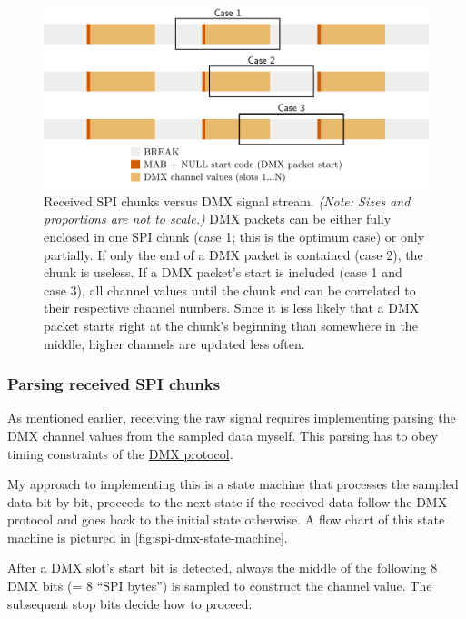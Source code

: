 \begin{figure}
\centering
\includegraphics[width=1.00000\textwidth]{Bilder/spi-dmx-chunks.pdf}
\caption[Received SPI chunks versus DMX signal stream]{Received SPI chunks versus DMX signal stream. \emph{(Note:
Sizes and proportions are not to scale.)} DMX packets can be either
fully enclosed in one SPI chunk (case 1; this is the optimum case) or
only partially. If only the end of a DMX packet is contained (case 2),
the chunk is useless. If a DMX packet's start is included (case 1 and
case 3), all channel values until the chunk end can be correlated to
their respective channel numbers. Since it is less likely that a DMX
packet starts right at the chunk's beginning than somewhere in the
middle, higher channels are updated less
often.}\label{fig:spi-dmx-chunks}
\end{figure}

\subsubsection{Parsing received SPI
chunks}\label{parsing-received-spi-chunks}

As mentioned earlier, receiving the raw signal requires implementing
parsing the DMX channel values from the sampled data myself. This
parsing has to obey timing constraints of the
\protect\hyperlink{sec:dmx-protocol}{DMX protocol}.

My approach to implementing this is a state machine that processes the
sampled data bit by bit, proceeds to the next state if the received data
follow the DMX protocol and goes back to the initial state otherwise. A
flow chart of this state machine is pictured in
\cref{fig:spi-dmx-state-machine}.

After a DMX slot's start bit is detected, always the middle of the
following 8 DMX bits (= 8 ``SPI bytes'') is sampled to construct the
channel value. The subsequent stop bits decide how to proceed:

